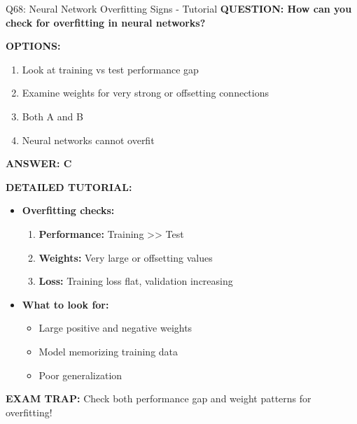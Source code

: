 \documentclass[8pt]{beamer}
\begin{document}
	\begin{frame}{Q68: Neural Network Overfitting Signs - Tutorial}
		\fontsize{6.5}{7.5}\selectfont
		\textbf{QUESTION: How can you check for overfitting in neural networks?}
		
		\vspace{0.1cm}
		\textbf{OPTIONS:}
		\begin{enumerate}
			\item Look at training vs test performance gap
			\item Examine weights for very strong or offsetting connections
			\item Both A and B
			\item Neural networks cannot overfit
		\end{enumerate}
		
		\vspace{0.1cm}
		\textcolor{myblue}{\textbf{ANSWER: C}}
		
		\vspace{0.1cm}
		\textbf{DETAILED TUTORIAL:}
		\begin{itemize}
			\item \textbf{Overfitting checks:}
			\begin{enumerate}
				\item \textbf{Performance:} Training >> Test
				\item \textbf{Weights:} Very large or offsetting values
				\item \textbf{Loss:} Training loss flat, validation increasing
			\end{enumerate}
			\item \textbf{What to look for:}
			\begin{itemize}
				\item Large positive and negative weights
				\item Model memorizing training data
				\item Poor generalization
			\end{itemize}
		\end{itemize}
		
		\textcolor{myred}{\textbf{EXAM TRAP:}} Check \textcolor{myblue}{both performance gap and weight patterns} for overfitting!
	\end{frame}
	
\end{document}
